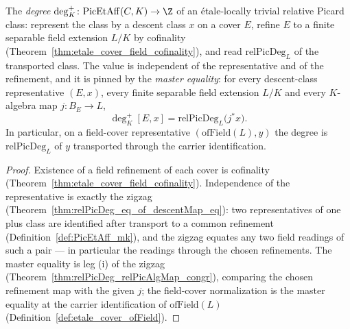 \begin{definition}
  \label{def:degAff}
  \leanok
  The \emph{degree} \(\deg^{+}_K \colon \mathrm{PicEtAff}(C, K) \to \Z\) of an
  \'etale-locally trivial relative Picard class: represent the class by a descent class
  \(x\) on a cover \(E\), refine \(E\) to a finite separable field extension \(L/K\) by
  cofinality (Theorem~\ref{thm:etale_cover_field_cofinality}), and read
  \(\mathrm{relPicDeg}_L\) of the transported class. The value is independent of the
  representative and of the refinement, and it is pinned by the \emph{master equality}: for
  every descent-class representative \((E, x)\), every finite separable field extension
  \(L/K\) and every \(K\)-algebra map \(j \colon B_E \to L\),
  \[
    \deg^{+}_K [E, x] = \mathrm{relPicDeg}_L\bigl(j^{*} x\bigr).
  \]
  In particular, on a field-cover representative \((\mathrm{ofField}(L), y)\) the degree is
  \(\mathrm{relPicDeg}_L\) of \(y\) transported through the carrier identification.
\end{definition}
\begin{proof}
  \leanok
  Existence of a field refinement of each cover is cofinality
  (Theorem~\ref{thm:etale_cover_field_cofinality}). Independence of the representative is
  exactly the zigzag (Theorem~\ref{thm:relPicDeg_eq_of_descentMap_eq}): two representatives
  of one plus class are identified after transport to a common refinement
  (Definition~\ref{def:PicEtAff_mk}), and the zigzag equates any two field readings of such
  a pair — in particular the readings through the chosen refinements. The master equality is
  leg (i) of the zigzag (Theorem~\ref{thm:relPicDeg_relPicAlgMap_congr}), comparing the
  chosen refinement map with the given \(j\); the field-cover normalization is the master
  equality at the carrier identification of \(\mathrm{ofField}(L)\)
  (Definition~\ref{def:etale_cover_ofField}).
\end{proof}

